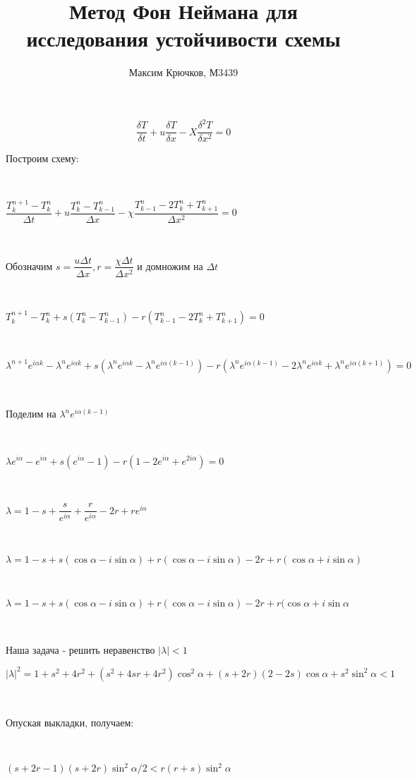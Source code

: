 \documentclass{article}
\author{Максим Крючков, М3439}
\title{Метод Фон Неймана для исследования устойчивости схемы}
\begin{document}
\maketitle


$$\dfrac{\delta T}{\delta t} + u \dfrac{\delta T}{\delta x} - X \dfrac{\delta^2T}{\delta x^2} = 0$$

Построим схему:

~\

$\dfrac{T_k^{n + 1} - T_k^n}{\Delta t} + u \dfrac{T_k^n - T_{k - 1}^n}{\Delta x} - \chi \dfrac{T_{k - 1}^n - 2T_k^n + T_{k + 1}^n}{\Delta x^2} = 0$

~\

Обозначим $s = \dfrac{u \Delta t}{\Delta x}, r = \dfrac{\chi \Delta t}{\Delta x^2}$ и домножим на $\Delta t$

~\

$T_k^{n + 1} - T_k^n + s(T_k^n - T_{k - 1}^n) - r(T^n_{k - 1} - 2T_k^n + T_{k + 1}^n) = 0$

~\

$\lambda^{n + 1}e^{i \alpha k} - \lambda^{n}e^{i \alpha k} + s(\lambda^{n}e^{i \alpha k} - \lambda^ne^{i \alpha (k - 1)}) - r(\lambda^{n}e^{i \alpha (k - 1)} - 2 \lambda^{n}e^{i \alpha k} + \lambda^{n}e^{i \alpha (k + 1)}) = 0$

~\

Поделим на $\lambda^n e^{i \alpha (k - 1)}$

~\

$\lambda e^{i \alpha} - e^{i \alpha} + s(e^{i \alpha} - 1) - r(1 - 2 e^{i \alpha} + e^{2 i \alpha}) = 0$

~\

$\lambda = 1 - s + \dfrac{s}{e^{i \alpha}} + \dfrac{r}{e^{i \alpha}} - 2r + re^{i \alpha}$

~\

$\lambda = 1 - s + s(\cos{\alpha} - i \sin{\alpha}) + r(\cos{\alpha} - i \sin{\alpha}) - 2r + r(\cos{\alpha} + i \sin{\alpha})$

~\

$\lambda = 1 - s + s(\cos{\alpha} - i \sin{\alpha}) + r(\cos{\alpha} - i \sin{\alpha}) - 2r + r(\cos{\alpha} + i \sin{\alpha}$

~\

Наша задача - решить неравенство $| \lambda | < 1$

$|\lambda|^2 = 1 + s^2 + 4r^2 + (s^2 + 4sr + 4r^2)\cos^2{\alpha} + (s + 2r)(2 - 2s)\cos{\alpha} + s^2 \sin^2{\alpha} < 1$

~\

Опуская выкладки, получаем:

~\

$(s + 2r - 1)(s + 2r)\sin^2{\alpha / 2} < r(r + s)\sin^2{\alpha}$
\end{document}
